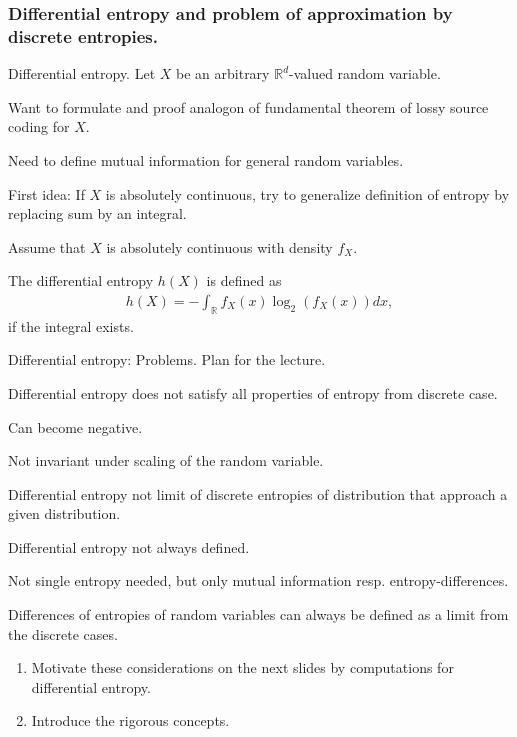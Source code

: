 \subsubsection{Differential entropy and problem of approximation by discrete entropies.}
\begin{frame}{Differential entropy.}
Let $X$ be an arbitrary $\mathbb{R}^d$-valued random variable.

\bit
\item Want to formulate and proof analogon of fundamental theorem of lossy source coding for $X$. 
\item Need to define mutual information for general random variables. 
\item First idea: If $X$ is absolutely continuous, try to generalize definition of entropy by replacing sum by an integral.
\eit 

\bit
\item Assume that $X$ is absolutely continuous with density $f_X$. 
\item The differential entropy 
$h(X)$ is defined as 
\begin{align*}
h(X)=-\int_{\mathbb{R}}f_X(x)\log_2(f_X(x))dx,
\end{align*} 
if the integral exists. 
\eit
\end{frame}

\begin{frame}{Differential entropy: Problems. Plan for the lecture.}
\bit 
\item Differential entropy does not satisfy all properties of entropy from discrete case. 
\bit
\item Can become negative.
\item  Not invariant under scaling of the random variable. 
\eit
\item Differential entropy not limit of discrete entropies of distribution that approach 
a given distribution.
\item Differential entropy not always defined. 
\eit
\vspace{-0.2cm} 
\bit
\item Not single entropy needed, but only mutual information resp. entropy-differences. 
\item Differences of entropies of random variables can always be defined as a limit from the discrete cases. 
\item[\iarrow] 
\begin{enumerate}
\item Motivate these considerations on the next slides by computations for differential entropy.
\item Introduce the rigorous concepts. 
\end{enumerate}
\item [\iarrow] 
\eit
\end{frame}


